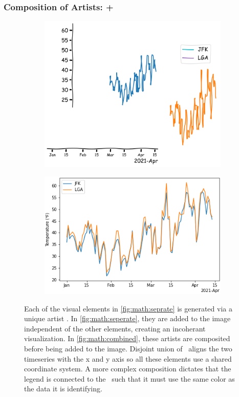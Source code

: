 \documentclass[../main.tex]{subfiles}
\begin{document}
\subsubsection{Composition of Artists: +}
\begin{figure}[H]
\begin{subfigure}{.5\textwidth}
    \includegraphics[width=1\textwidth]{figures/math/exploding_artist.png}
    \caption{}
    \label{fig:math:seperate}    
\end{subfigure}
\begin{subfigure}{.5\textwidth}
    \includegraphics[width=1\textwidth]{figures/math/combined_artist.png}
    \caption{}
    \label{fig:math:combined}
\end{subfigure}
\caption{Each of the visual elements in \autoref{fig:math:seprate} is generated via a unique artist \vartist. In \autoref{fig:math:seperate}, they are added to the image independent of the other elements, creating an incoherant visualization. In \autoref{fig:math:combined}, these artists are composited before being added to the image. Disjoint union of \dtotal\ aligns the two timeseries with the x and y axis so all these elements use a shared coordinate system. A more complex composition dictates that the legend is connected to the \dtotal\ such that it must use the same color as the data it is identifying.}
\label{fig:artist_plus}
\end{figure}
\end{document}
